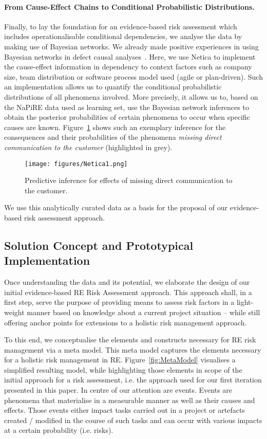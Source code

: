 \documentclass[lnbip]{svmultln}
\begin{document}
\paragraph{From Cause-Effect Chains to Conditional Probabilistic Distributions.}

Finally, to lay the foundation for an evidence-based risk assessment which includes operationalisable conditional dependencies, we analyse the data by making use of Bayesian networks. We already made positive experiences in using Bayesian networks in defect causal analyses~\cite{K++17}. Here, we use Netica to implement the cause-effect information in dependency to context factors such as company size, team distribution or software process model used (agile or plan-driven). Such an implementation allows us to quantify the conditional probabilistic distributions of all phenomena involved. More precisely, it allows us to, based on the NaPiRE data used as learning set, use the Bayesian network inferences to obtain the posterior probabilities of certain phenomena to occur when specific causes are known. Figure~\ref{fig:Netica} shows such an exemplary inference for the consequences and their probabilities of the phenomena \emph{missing direct communication to the customer} (highlighted in grey). 
\begin{figure}[!hbtp]
\centering
  \texttt{[image: figures/Netica1.png]}\\
  \caption{Predictive inference for effects of missing direct communication to the customer.}
  \label{fig:Netica}
\end{figure} 

We use this analytically curated data as a basis for the proposal of our evidence-based risk assessment approach.

\subsection{Solution Concept and Prototypical Implementation}
Once understanding the data and its potential, we elaborate the design of our initial evidence-based RE Risk Assessment approach. This approach shall, in a first step, serve the purpose of providing means to assess risk factors in a light-weight manner based on knowledge about a current project situation -- while still offering anchor points for extensions to a holistic risk management approach.

To this end, we conceptualise the elements and constructs necessary for RE risk management via a meta model. This meta model captures the elements necessary for a holistic risk management in RE. Figure~\ref{fig:MetaModel} visualises a simplified resulting model, while highlighting those elements in scope of the initial approach for a risk assessment, i.e. the approach used for our first iteration presented in this paper. In centre of our attention are events. Events are phenomena that materialise in a measurable manner as well as their causes and effects. Those events either impact tasks carried out in a project or artefacts created / modified in the course of such tasks and can occur with various impacts at a certain probability (i.e. risks). 
\end{document}
